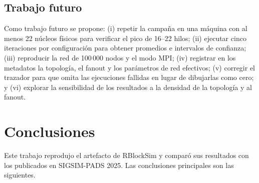\documentclass[11pt,a4paper,oneside]{article}
\begin{document}
\subsection{Trabajo futuro}

Como trabajo futuro se propone: (i) repetir la campaña en una máquina con al menos 22 núcleos físicos para verificar el pico de 16--22 hilos; (ii) ejecutar cinco iteraciones por configuración para obtener promedios e intervalos de confianza; (iii) reproducir la red de 100\,000 nodos y el modo MPI; (iv) registrar en los metadatos la topología, el fanout y los parámetros de red efectivos; (v) corregir el trazador para que omita las ejecuciones fallidas en lugar de dibujarlas como cero; y (vi) explorar la sensibilidad de los resultados a la densidad de la topología y al fanout.

\section{Conclusiones}
\label{sec:conclusiones}

Este trabajo reprodujo el artefacto de RBlockSim y comparó sus resultados con los publicados en SIGSIM-PADS 2025. Las conclusiones principales son las siguientes.
\end{document}
